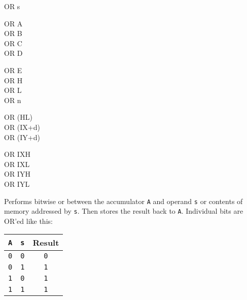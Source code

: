 \begin{basedescript}{
    \desclabelstyle{\multilinelabel}
    \desclabelwidth{3cm}}
\begin{DetailItem}{OR s}
        \begin{DetailVariants}[4]
            OR A\\
            OR B\\
            OR C\\
            OR D

            \columnbreak
            OR E\\
            OR H\\
            OR L\\
            OR n

            \columnbreak
            OR (HL)\\
            OR (IX+d)\\
            OR (IY+d)

            \columnbreak
            OR IXH\UNDOC\\
            OR IXL\UNDOC\\
            OR IYH\UNDOC\\
            OR IYL\UNDOC
        \end{DetailVariants}

        Performs bitwise or between the accumulator {\tt A} and operand {\tt s} or contents of memory addressed by {\tt s}. Then stores the result back to {\tt A}. Individual bits are OR'ed like this:

        \begin{tabular}{cc|c}
            {\tt A} & {\tt s} & Result \\
            \hline
            {\tt 0} & {\tt 0} & {\tt 0} \\
            {\tt 0} & {\tt 1} & {\tt 1} \\
            {\tt 1} & {\tt 0} & {\tt 1} \\
            {\tt 1} & {\tt 1} & {\tt 1} \\
        \end{tabular}

        \begin{DetailEffects}[v]
            \FlagsORr
        \end{DetailEffects}
				
        \begin{DetailTiming}
        \end{DetailTiming}

    \end{DetailItem}


\end{basedescript}
